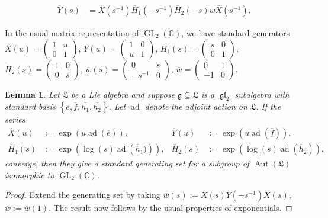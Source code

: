 \documentclass[11pt,letterpaper]{amsart}
\newcounter{thecounter}
\numberwithin{thecounter}{section}
\newtheorem{lemma}[thecounter]{Lemma}
\theoremstyle{definition}
\DeclareMathOperator{\GL}{GL}
\DeclareMathOperator{\gl}{\mathfrak{gl}}
\DeclareMathOperator{\Aut}{Aut}
\DeclareMathOperator{\ad}{ad}
\newcommand{\C}{{\mathbb C}}
\begin{document}
\begin{align*}
\tag{GL:7}\label{GL2-Yelim}
  \overline{Y}(s)& =\overline{X}\left(s^{-1} \right)\overline{H}_1\left(-s^{-1} \right)\overline{H}_2\left(-s \right)\overline{w}\overline{X}\left(s^{-1} \right).
\end{align*}

\endgroup
In the usual matrix representation of $\GL_2(\C)$, we have standard generators
$\overline{X}(u)=\left(\begin{smallmatrix} 1&u\\0&1\end{smallmatrix}\right)$,
$\overline{Y}(u)=\left(\begin{smallmatrix} 1&0\\u&1\end{smallmatrix}\right)$,
$\overline{H}_1(s)=\left(\begin{smallmatrix} s&0\\0&1\end{smallmatrix}\right)$,
$\overline{H}_2(s)=\left(\begin{smallmatrix} 1&0\\0&s\end{smallmatrix}\right)$,
$\overline{w}(s)=\left(\begin{smallmatrix} 0&s\\-s^{-1}&0\end{smallmatrix}\right)$,
$\overline{w}=\left(\begin{smallmatrix} 0&1\\-1&0\end{smallmatrix}\right)$.


\begin{lemma}
Let $\mathfrak{L}$ be a Lie algebra and suppose $\mathfrak{g}\subseteq\mathfrak{L}$
is a $\gl_2$ subalgebra with standard basis $\left\{\overline{e},\overline{f},\overline{h_1},\overline{h_2} \right\}$.
Let $\ad$ denote the adjoint action on $\mathfrak{L}$.
If the series
\begin{align*}
\overline{X}(u) &:= \exp\left({u} \ad\left(\overline{e} \right) \right),&
\overline{Y}(u) &:= \exp\left({u} \ad\left(\overline{f} \right) \right),\\
\overline{H}_1(s) &:= \exp\left(\log(s)\ad\left(\overline{h}_1) \right) \right),&
\overline{H}_2(s) &:= \exp\left(\log(s)\ad\left(\overline{h}_2 \right) \right),
\end{align*}
converge, then they give a standard generating set for a subgroup of $\Aut(\mathfrak{L})$
isomorphic to $\GL_2(\C)$.
\end{lemma}
\begin{proof}
Extend the generating set by taking $\overline{w}(s) := \overline{X}(s) \overline{Y}\left(-s^{-1} \right) \overline{X}(s)$, $\overline{w} := \overline{w}(1)$. The result now follows by the usual properties of exponentials.
\end{proof}
\end{document}

